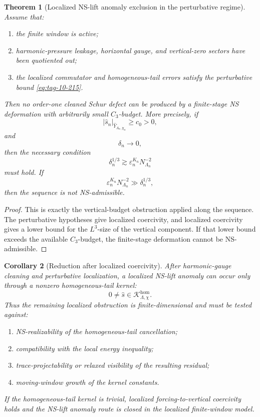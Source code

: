 \documentclass[11pt]{article}
\numberwithin{equation}{section}
\newtheorem{theorem}{Theorem}[section]
\newtheorem{corollary}[theorem]{Corollary}
\begin{document}
\begin{theorem}[Localized NS-lift anomaly exclusion in the perturbative regime]
Assume that:

\begin{enumerate}
\item the finite window is active;
\item harmonic-pressure leakage, horizontal gauge, and vertical-zero sectors have been quotiented out;
\item the localized commutator and homogeneous-tail errors satisfy the perturbative bound \eqref{eq:tag-10-215}.
\end{enumerate}

Then no order-one cleaned Schur defect can be produced by a finite-stage NS deformation with arbitrarily small \(C_3\)-budget. More precisely, if
\[
|\widehat s_n|_{\widehat Y_{\Lambda_n,\chi_n}}\ge c_0>0,
\]
and
\[
\delta_n\to0,
\]
then the necessary condition
\[
\delta_n^{1/3}
\gtrsim
\varepsilon_n^{K_n}N_{\Lambda_n}^{-2}
\]
must hold. If
\[
\varepsilon_n^{K_n}N_{\Lambda_n}^{-2}
\gg
\delta_n^{1/3},
\]
then the sequence is not NS-admissible.

\end{theorem}

\begin{proof}
This is exactly the vertical-budget obstruction applied along the sequence. The perturbative hypotheses give localized coercivity, and localized coercivity gives a lower bound for the \(L^3\)-size of the vertical component. If that lower bound exceeds the available \(C_3\)-budget, the finite-stage deformation cannot be NS-admissible.
\end{proof}

\begin{corollary}[Reduction after localized coercivity]
After harmonic-gauge cleaning and perturbative localization, a localized NS-lift anomaly can occur only through a nonzero homogeneous-tail kernel:
\[
0\neq\widehat s\in\mathcal K_{\Lambda,\chi}^{\mathrm{hom}}.
\]
Thus the remaining localized obstruction is finite-dimensional and must be tested against:

\begin{enumerate}
\item NS-realizability of the homogeneous-tail cancellation;
\item compatibility with the local energy inequality;
\item trace-projectability or relaxed visibility of the resulting residual;
\item moving-window growth of the kernel constants.
\end{enumerate}

If the homogeneous-tail kernel is trivial, localized forcing-to-vertical coercivity holds and the NS-lift anomaly route is closed in the localized finite-window model.
\end{corollary}
\end{document}
